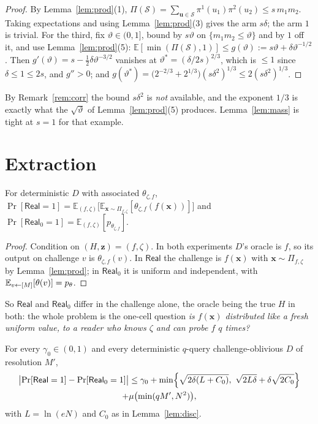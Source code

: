 \documentclass{aicr-solution}
\newcommand{\Real}{\mathsf{Real}}
\newcommand{\Prob}[1]{\Pr\!\left[#1\right]}
\newcommand{\Exp}{\mathbb{E}}
\newcommand{\vx}{\mathbf{x}}
\newcommand{\vz}{\mathbf{z}}
\newcommand{\vu}{\mathbf{u}}
\begin{document}
\begin{proof}
By Lemma~\ref{lem:prod}(1),
$\Pi(\mathcal S)=\sum_{\vu\in\mathcal S}\pi^1(u_1)\pi^2(u_2)\le s\,m_1m_2$.
Taking expectations and using Lemma~\ref{lem:prod}(3) gives the arm $s\delta$;
the arm $1$ is trivial. For the third, fix $\vartheta\in(0,1]$, bound by
$s\vartheta$ on $\{m_1m_2\le\vartheta\}$ and by $1$ off it, and use
Lemma~\ref{lem:prod}(5):
$\Exp[\min(\Pi(\mathcal S),1)]\le g(\vartheta):=s\vartheta+\delta\vartheta^{-1/2}$.
Then $g'(\vartheta)=s-\tfrac12\delta\vartheta^{-3/2}$ vanishes at
$\vartheta^{*}=(\delta/2s)^{2/3}$, which is $\le1$ since $\delta\le1\le2s$, and
$g''>0$; and
$g(\vartheta^{*})=\bigl(2^{-2/3}+2^{1/3}\bigr)(s\delta^{2})^{1/3}\le2(s\delta^{2})^{1/3}$.
\end{proof}

By Remark~\ref{rem:corr} the bound $s\delta^{2}$ is \emph{not} available, and the
exponent $1/3$ is exactly what the $\sqrt\vartheta$ of Lemma~\ref{lem:prod}(5)
produces. Lemma~\ref{lem:mass} is tight at $s=1$ for that example.

\section{Extraction}\label{sec:extraction}

\begin{lemma}\label{lem:ident}
For deterministic $D$ with associated $\theta_{\zeta,f}$,
$\Prob{\Real=1}=\Exp_{(f,\zeta)}\bigl[\Exp_{\vx\sim\Pi_{f,\zeta}}[\theta_{\zeta,f}(f(\vx))]\bigr]$
and $\Prob{\Real_0=1}=\Exp_{(f,\zeta)}[p_{\theta_{\zeta,f}}]$.
\end{lemma}

\begin{proof}
Condition on $(H,\vz)=(f,\zeta)$. In both experiments $D$'s oracle is $f$, so its
output on challenge $v$ is $\theta_{\zeta,f}(v)$. In $\Real$ the challenge is
$f(\vx)$ with $\vx\sim\Pi_{f,\zeta}$ by Lemma~\ref{lem:prod}; in $\Real_0$ it is
uniform and independent, with $\Exp_{v\sample[M]}[\theta(v)]=p_\theta$.
\end{proof}

So $\Real$ and $\Real_0$ differ in the challenge alone, the oracle being the true
$H$ in both: the whole problem is the one-cell question \emph{is $f(\vx)$
distributed like a fresh uniform value, to a reader who knows $\zeta$ and can
probe $f$ $q$ times?}

\begin{proposition}\label{prop:master}
For every $\gamma_0\in(0,1)$ and every deterministic $q$-query
challenge-oblivious $D$ of resolution $M'$,
\begin{multline*}
  \bigl|\Prob{\Real=1}-\Prob{\Real_0=1}\bigr|\le\gamma_0
  +\min\Bigl\{\sqrt{2\delta(L+C_0)},\ \sqrt{2L\delta}+\delta\sqrt{2C_0}\Bigr\}\\
  +\mu\bigl(\min(qM',N^{2})\bigr),
\end{multline*}
with $L=\ln(eN)$ and $C_0$ as in Lemma~\ref{lem:disc}.
\end{proposition}
\end{document}
